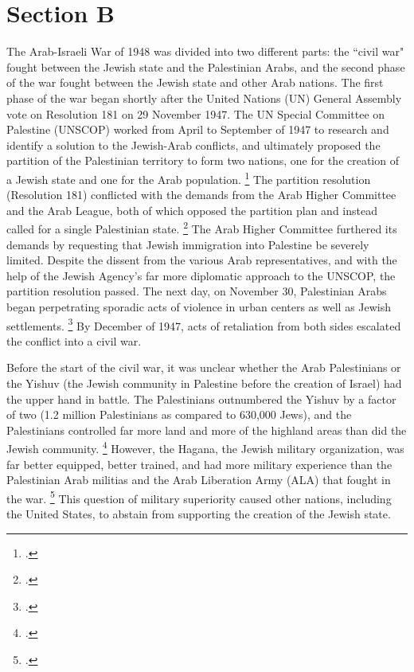 \documentclass{turabian-researchpaper}
\begin{document}
\section{Section B}
The Arab-Israeli War of 1948 was divided into two different parts: the ``civil war" fought between the Jewish state and the Palestinian Arabs, and the second phase of the war fought between the Jewish state and other Arab nations.  The first phase of the war began shortly after the United Nations (UN) General Assembly vote on Resolution 181 on 29 November 1947.  The UN Special Committee on Palestine (UNSCOP) worked from April to September of 1947 to research and identify a solution to the Jewish-Arab conflicts, and ultimately proposed the partition of the Palestinian territory to form two nations, one for the creation of a Jewish state and one for the Arab population.
\footcite[22]{pappe}
The partition resolution (Resolution 181) conflicted with the demands from the Arab Higher Committee and the Arab League, both of which opposed the partition plan and instead called for a single Palestinian state.
\footcite[][23]{pappe}
The Arab Higher Committee furthered its demands by requesting that Jewish immigration into Palestine be severely limited.  Despite the dissent from the various Arab representatives, and with the help of the Jewish Agency's far more diplomatic approach to the UNSCOP, the partition resolution passed.  The next day, on November 30, Palestinian Arabs began perpetrating sporadic acts of violence in urban centers as well as Jewish settlements.
\footcite[][77]{morris}
By December of 1947, acts of retaliation from both sides escalated the conflict into a civil war.

Before the start of the civil war, it was unclear whether the Arab Palestinians or the Yishuv (the Jewish community in Palestine before the creation of Israel) had the upper hand in battle.  The Palestinians outnumbered the Yishuv by a factor of two (1.2 million Palestinians as compared to 630,000 Jews), and the Palestinians controlled far more land and more of the highland areas than did the Jewish community.
\footcite[][30]{bartal}
However, the Hagana, the Jewish military organization, was far better equipped, better trained, and had more military experience than the Palestinian Arab militias and the Arab Liberation Army (ALA) that fought in the war.
\footcite[][81]{morris}
This question of military superiority caused other nations, including the United States, to abstain from supporting the creation of the Jewish state.
\end{document}
